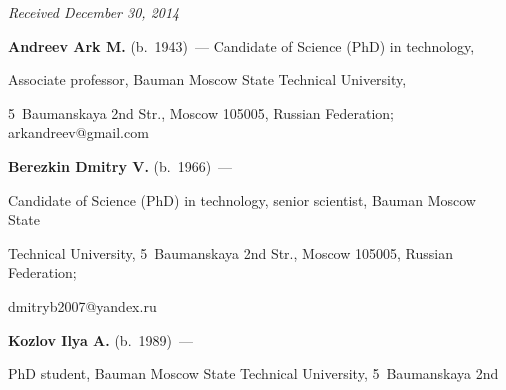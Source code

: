 {{

} }





\vspace*{-6pt}



\hfill{\small\textit{Received December 30, 2014}}





  \Contr



\noindent

\textbf{Andreev Ark M.} (b.\ 1943)~--- Candidate of Science (PhD) in technology,

Associate professor, Bauman Moscow State Technical University,

5~Baumanskaya 2nd Str., Moscow 105005, Russian Federation; arkandreev@gmail.com



\pagebreak



\noindent

\textbf{Berezkin Dmitry V.} (b.\ 1966)~---

Candidate of Science (PhD) in technology, senior scientist, Bauman Moscow State

Technical University, 5~Baumanskaya 2nd Str., Moscow 105005, Russian Federation;

dmitryb2007@yandex.ru



\vspace*{3pt}



\noindent

\textbf{Kozlov Ilya A.} (b.\ 1989)~---

PhD student, Bauman Moscow State Technical University, 5~Baumanskaya 2nd

